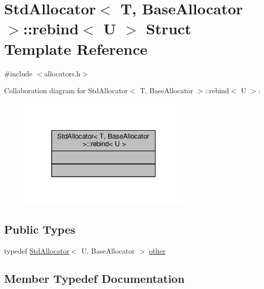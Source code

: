 \hypertarget{structStdAllocator_1_1rebind}{}\section{Std\+Allocator$<$ T, Base\+Allocator $>$\+:\+:rebind$<$ U $>$ Struct Template Reference}
\label{structStdAllocator_1_1rebind}


{\ttfamily \#include $<$allocators.\+h$>$}



Collaboration diagram for Std\+Allocator$<$ T, Base\+Allocator $>$\+:\+:rebind$<$ U $>$\+:
\nopagebreak
\begin{figure}[H]
\begin{center}
\leavevmode
\includegraphics[width=232pt]{structStdAllocator_1_1rebind__coll__graph}
\end{center}
\end{figure}
\subsection*{Public Types}
\begin{DoxyCompactItemize}
\item 
typedef \hyperlink{classStdAllocator}{Std\+Allocator}$<$ U, Base\+Allocator $>$ \hyperlink{structStdAllocator_1_1rebind_ad1492f350e2dec2087141aa68b390792}{other}
\end{DoxyCompactItemize}


\subsection{Member Typedef Documentation}
\mbox{\label{structStdAllocator_1_1rebind_ad1492f350e2dec2087141aa68b390792}} 
